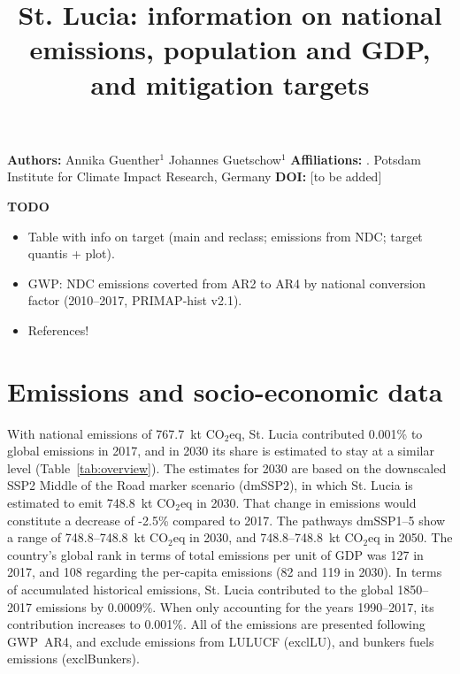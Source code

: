 \documentclass[12pt]{article}
\title{ \bfseries \color{PIKorange} St. Lucia: information on national emissions, population and GDP, and mitigation targets}
\begin{document}
 \maketitle

 \noindent \textbf{Authors:} \newline
 \indent Annika Guenther$^{1}$ \newline
 \indent Johannes Guetschow$^{1}$ \newline
 \noindent \textbf{Affiliations:} \newline
 . Potsdam Institute for Climate Impact Research, Germany \newline
 \noindent \textbf{DOI:} [to be added] \newline

 \textbf{TODO}
 \begin{itemize}
 \item Table with info on target (main and reclass; emissions from NDC; target quantis + plot).
 \item GWP: NDC emissions coverted from AR2 to AR4 by national conversion factor (2010--2017, PRIMAP-hist v2.1).
 \item References!
 \end{itemize}

 \newpage %
 \section{Emissions and socio-economic data}
 \label{sec:nonLULUCFSocioEco}
 With national emissions of 767.7~kt CO$_2$eq, St. Lucia contributed 0.001\% to global emissions in 2017, and in 2030 its share is estimated to stay at a similar level (Table~\ref{tab:overview}).
 The estimates for 2030 are based on the downscaled SSP2 Middle of the Road marker scenario (dmSSP2), in which St. Lucia is estimated to emit 748.8~kt CO$_2$eq in 2030.
 That change in emissions would constitute a decrease of -2.5\% compared to 2017. 
 The pathways dmSSP1--5 show a range of 748.8--748.8~kt CO$_2$eq in 2030, and 748.8--748.8~kt CO$_2$eq in 2050.
 The country's global rank in terms of total emissions per unit of GDP was 127 in 2017, and 108 regarding the per-capita emissions (82 and 119 in 2030).
 In terms of accumulated historical emissions, St. Lucia contributed to the global 1850--2017 emissions by 0.0009\%. 
 When only accounting for the years 1990--2017, its contribution increases to 0.001\%.
 All of the emissions are presented following GWP~AR4, and exclude emissions from LULUCF (exclLU), and bunkers fuels emissions (exclBunkers).
\end{document}
